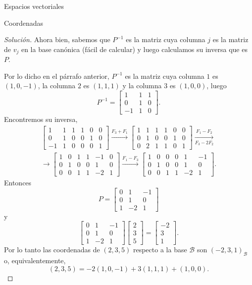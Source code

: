 \documentclass[a4paper,12pt,twoside,spanish]{amsbook}
\theoremstyle{definition}
\theoremstyle{remark}
\begin{document}
\begin{chapter}{Espacios vectoriales}
\begin{section}{Coordenadas}
\begin{proof}[Solución]
	
	Ahora bien, sabemos que $P^{-1}$ es la matriz cuya columna $j$ es la matriz de $v_j$ en la base canónica (fácil de calcular) y luego calculamos su inversa que es $P$.
	
	Por lo dicho en el párrafo anterior, $P^{-1}$  es la matriz cuya  columna $1$ es $(1,0,-1)$,  la columna $2$ es $(1,1,1)$ y la columna $3$ es $(1,0,0)$, luego 
	$$
	P^{-1} = \begin{bmatrix} 1&1&1\\0&1&0\\-1&1&0	\end{bmatrix}.
	$$ 
	Encontremos su inversa,
		\begin{multline*} 
	\left[\begin{array}{rrr|rrr}	1&1&1&1&0&0\\ 0&1&0&0&1&0\\ -1&1&0&0&0&1 \end{array}\right]
	\stackrel{F_3+ F_1}{\longrightarrow}
	\left[\begin{array}{rrr|rrr}	1&1&1&1&0&0\\ 0&1&0&0&1&0\\ 0&2&1&1&0&1 \end{array}\right]
	\underset{F_3-2F_2}{\stackrel{F_1 - F_2}{\longrightarrow}}\\
	\longrightarrow 
	\left[\begin{array}{rrr|rrr}	1&0&1&1&-1&0\\ 0&1&0&0&1&0\\ 0&0&1&1&-2&1 \end{array}\right]
	\stackrel{F_1 - F_3}{\longrightarrow}
	\left[\begin{array}{rrr|rrr}	1&0&0&0&1&-1\\ 0&1&0&0&1&0\\ 0&0&1&1&-2&1 \end{array}\right]
	.
	\end{multline*}
	Entonces 
	$$
	P = \left[\begin{array}{rrr}	0&1&-1\\ 0&1&0\\ 1&-2&1 \end{array}\right]
	$$
	y 
	$$
	\left[\begin{array}{rrr}	0&1&-1\\ 0&1&0\\ 1&-2&1 \end{array}\right]
	\left[\begin{array}{r} 2\\3\\5 \end{array}\right] = 
	\left[\begin{array}{r} -2\\3\\1 \end{array}\right].
	$$
	Por  lo tanto las coordenadas de   $(2,3,5)$ respecto a la base  $\mathcal{B}$ son $(-2,3,1)_{\mathcal B}$ o,  equivalentemente, 
	$$
	(2,3,5) = -2(1,0,-1)+3(1,1,1)+(1,0,0).
	$$
	

\end{proof}
\end{section}
\end{chapter}
\end{document}

